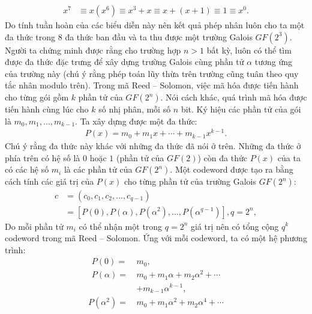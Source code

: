 \begin{multicols}{2}
\begin{align*}
		x^7&\equiv x(x^6 )\equiv x^3\!+\!x\equiv x\!+\!(x\!+\!1)\equiv 1\equiv x^0.
	\end{align*}
	Do tính tuần hoàn của các biểu diễn này nên kết quả phép nhân luôn cho ta một đa thức trong $8$ đa thức ban đầu và ta thu được một trường Galois $GF(2^3)$. Người ta chứng minh được rằng cho trường hợp $n>1$ bất kỳ, luôn có thể tìm được đa thức đặc trưng để xây dựng trường Galois cùng phần tử $\alpha$ tương ứng của trường này (chú ý rằng phép toán lũy thừa trên trường cũng tuân theo quy tắc nhân modulo trên).
	\vskip 0.05cm
	Trong mã Reed -- Solomon, việc mã hóa được tiến hành cho từng gói gồm $k$ phần tử của $GF(2^n)$. Nói cách khác, quá trình mã hóa được tiến hành cùng lúc cho $k$ số nhị phân, mỗi số $n$ bit. Ký hiệu các phần tử của gói là $m_0,m_1,\ldots,m_{k-1}$. Ta xây dựng được một đa thức:
	\begin{align*}
		P(x)=m_0+m_1x+ \cdots +m_{k-1} x^{k-1}.
	\end{align*}
	Chú ý rằng đa thức này khác với những đa thức đã nói ở trên. Những đa thức ở phía trên có hệ số là $0$ hoặc $1$ (phần tử của $GF(2)$) còn đa thức $P(x)$ của ta có các hệ số $m_i$ là các phần tử của $GF(2^n)$. Một codeword được tạo ra bằng cách tính các giá trị của $P(x)$ cho từng phần tử của trường Galois $GF(2^n)$:
	\begin{align*}
	c &\!=\! \left(c_0,c_1,c_2,\ldots,c_{q-1}\right) \\[-0.5ex]
	&\!=\!\! \left[\!P(0), P(\!\alpha\!), P(\alpha^2), \ldots, P(\alpha^{q-1}\!)\!\right]\!,q \!=\! 2^n,
	\end{align*}
	Do mỗi phần tử $m_i$ có thể nhận một trong $q=2^n$ giá trị nên có tổng cộng $q^k$ codeword trong mã Reed -- Solomon. Ứng với mỗi codeword, ta có một hệ phương trình:
	\begin{align*}
		P(0)=\,&m_0, \\[-0.5ex]
		P(\alpha)=\,&m_0+m_1 \alpha+m_2 \alpha^2+\cdots\\[-0.5ex]
		&+m_{k-1} \alpha^{k-1},
		\end{align*}
		\begin{align*}
		P(\alpha^2 )=\,&m_0+m_1 \alpha^2+m_2 \alpha^4+\cdots\\[-0.5ex]

\end{align*}
\end{multicols}

